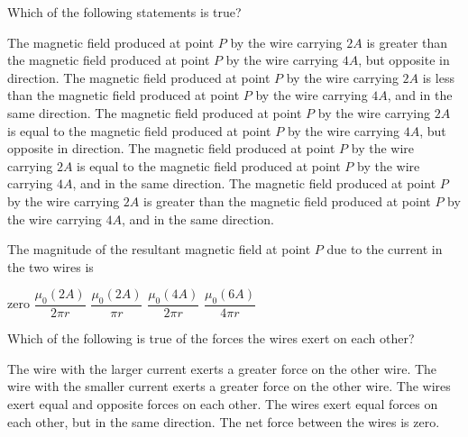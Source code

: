 \documentclass{../../../oss-apphys-exam}
\begin{document}
\begin{multicols*}{2}
\begin{questions}
    \question Which of the following statements is true?
    \begin{choices}
      \choice The magnetic field produced at point $P$ by the wire carrying
      $2A$ is greater than the magnetic field produced at point $P$ by the wire
      carrying $4A$, but opposite in direction.
      \choice The magnetic field produced at point $P$ by the wire carrying
      $2A$ is less than the magnetic field produced at point $P$ by the wire
      carrying $4A$, and in the same direction.
      \choice The magnetic field produced at point $P$ by the wire carrying
      $2A$ is equal to the magnetic field produced at point $P$ by the wire
      carrying $4A$, but opposite in direction.
      \choice The magnetic field produced at point $P$ by the wire carrying
      $2A$ is equal to the magnetic field produced at point $P$ by the wire
      carrying $4A$, and in the same direction.
      \choice The magnetic field produced at point $P$ by the wire carrying
      $2A$ is greater than the magnetic field produced at point $P$ by the wire
      carrying $4A$, and in the same direction.
    \end{choices}
    \label{q:2wires1}
    
    \question The magnitude of the resultant magnetic field at point $P$ due to
    the current in the two wires is
    \begin{choices}
      \choice zero
      \choice $\dfrac{\mu_0(2A)}{2\pi r}$
      \choice $\dfrac{\mu_0(2A)}{\pi r}$
      \choice $\dfrac{\mu_0(4A)}{2\pi r}$
      \choice $\dfrac{\mu_0(6A)}{4\pi r}$
    \end{choices}
    \label{q:2wires2}
    \columnbreak


    \question Which of the following is true of the forces the wires exert on
    each other?
    \begin{choices}
      \choice The wire with the larger current exerts a greater force on the
      other wire.
      \choice The wire with the smaller current exerts a greater force on the
      other wire.
      \choice The wires exert equal and opposite forces on each other.
      \choice The wires exert equal forces on each other, but in the same
      direction.
      \choice The net force between the wires is zero.
    \end{choices}
    \label{q:2curr1}
    

\end{questions}
\end{multicols*}
\end{document}
